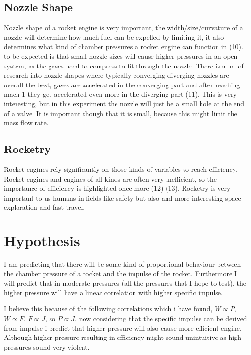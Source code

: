 \documentclass[12pt,a4paper]{article}
\begin{document}
\subsection{Nozzle Shape}

Nozzle shape of a rocket engine is very important, the width/size/curvature of a nozzle will determine how much fuel can be expelled by limiting it, it also determines what kind of chamber pressures a rocket engine can function in (10). to be expected is that small nozzle sizes will cause higher pressures in an open system, as the gases need to compress to fit through the nozzle. There is a lot of research into nozzle shapes where typically converging diverging nozzles are overall the best, gases are accelerated in the converging part and after reaching mach 1 they get accelerated even more in the diverging part (11). This is very interesting, but in this experiment the nozzle will just be a small hole at the end of a valve. It is important though that it is small, because this might limit the mass flow rate.

\subsection{Rocketry}

Rocket engines rely significantly on those kinds of variables to reach efficiency. Rocket engines and engines of all kinds are often very inefficient, so the importance of efficiency is highlighted once more (12) (13). Rocketry is very important to us humans in fields like safety but also and more interesting space exploration and fast travel. 

\section{Hypothesis}

I am predicting that there will be some kind of proportional behaviour between the chamber pressure of a rocket and the impulse of the rocket. Furthermore I will predict that in moderate pressures (all the pressures that I hope to test), the higher pressure will have a linear correlation with higher specific impulse. 

I believe this because of the following correlations which i have found, $W \propto P$, $W \propto F$, $F \propto J$, so $P \propto J$, now considering that the specific impulse can be derived from impulse i predict that higher pressure will also cause more efficient engine. Although higher pressure resulting in efficiency might sound unintuitive as high pressures sound very violent.
\end{document}
